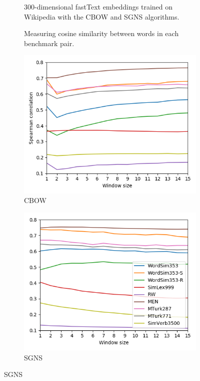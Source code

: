 \documentclass[extrafontsizes,60pt,twocolumn]{memoir}
\begin{document}
    \begin{figure}[h]
        \begin{subfigure}[c]{.2\columnwidth}
          300-dimensional fastText embeddings trained on Wikipedia with the CBOW and SGNS algorithms.
          
          \vspace{1in}
          Measuring cosine similarity between words in each benchmark pair.
        \end{subfigure}
        \hspace{1in}
        \begin{subfigure}[c]{.35\columnwidth}
        \includegraphics[width=\columnwidth]{similarities_fasttext_enwiki-20170501-clean_cbow-300d-min500_eval.png}
        \caption{CBOW}
        \end{subfigure}
        \hfill
        \begin{subfigure}[c]{.35\columnwidth}
        \includegraphics[width=\columnwidth]{similarities_fasttext_enwiki-20170501-clean_skipgram-300d-min500_eval.png}
        \caption{SGNS}
        \end{subfigure}
    \end{figure}
    
\end{document}
